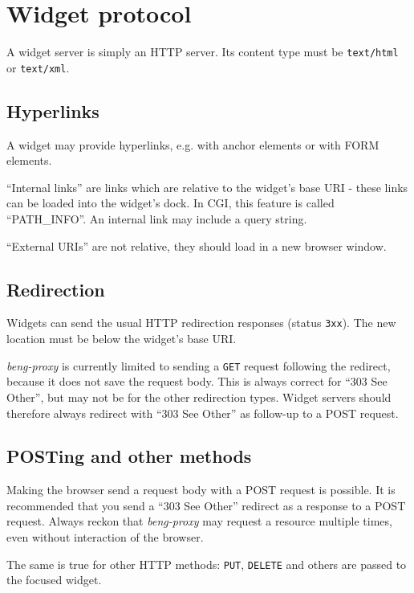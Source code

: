 \documentclass[a4paper,12pt]{article}
\begin{document}
\section{Widget protocol}

A widget server is simply an HTTP server.  Its content type must be
\texttt{text/html} or \texttt{text/xml}.


\subsection{Hyperlinks}

A widget may provide hyperlinks, e.g. with anchor elements or with
FORM elements.

``Internal links'' are links which are relative to the widget's base
URI - these links can be loaded into the widget's dock.  In CGI, this
feature is called ``PATH\_INFO''.  An internal link may include a
query string.

``External URIs'' are not relative, they should
load in a new browser window.

\subsection{Redirection}

Widgets can send the usual HTTP redirection responses (status
\texttt{3xx}).  The new location must be below the widget's base URI.

\emph{beng-proxy} is currently limited to sending a \texttt{GET}
request following the redirect, because it does not save the request
body.  This is always correct for ``303 See Other'', but may not be
for the other redirection types.  Widget servers should therefore
always redirect with ``303 See Other'' as follow-up to a POST request.

\subsection{POSTing and other methods}

Making the browser send a request body with a POST request is
possible.  It is recommended that you send a ``303 See Other''
redirect as a response to a POST request.  Always reckon that
\emph{beng-proxy} may request a resource multiple times, even without
interaction of the browser.

The same is true for other HTTP methods: \texttt{PUT}, \texttt{DELETE}
and others are passed to the focused widget.
\end{document}
